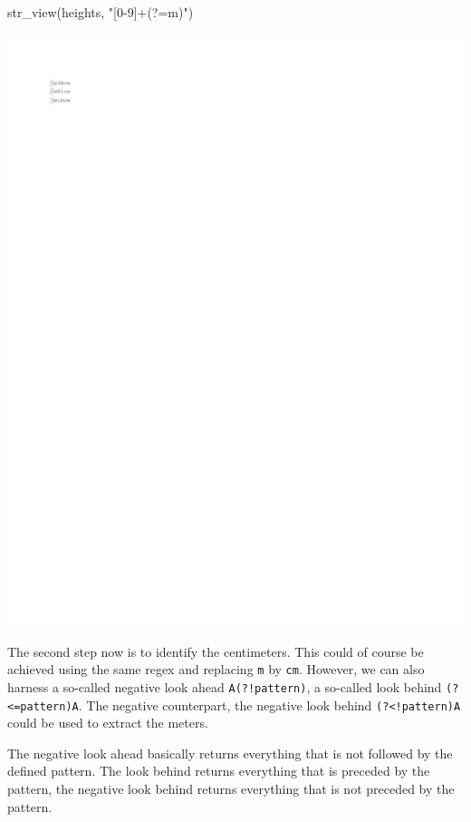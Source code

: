\documentclass[
]{book}
\newenvironment{Shaded}{\begin{snugshade}}{\end{snugshade}}
\newcommand{\FunctionTok}[1]{\textcolor[rgb]{0.00,0.00,0.00}{#1}}
\newcommand{\NormalTok}[1]{#1}
\newcommand{\StringTok}[1]{\textcolor[rgb]{0.31,0.60,0.02}{#1}}
\begin{document}
\begin{Shaded}
\begin{Highlighting}[]
\FunctionTok{str\_view}\NormalTok{(heights, }\StringTok{"[0{-}9]+(?=m)"}\NormalTok{)}
\end{Highlighting}
\end{Shaded}

\includegraphics{_main_files/figure-latex/unnamed-chunk-40-1.pdf}

The second step now is to identify the centimeters. This could of course be achieved using the same regex and replacing \texttt{m} by \texttt{cm}. However, we can also harness a so-called negative look ahead \texttt{A(?!pattern)}, a so-called look behind \texttt{(?\textless{}=pattern)A}. The negative counterpart, the negative look behind \texttt{(?\textless{}!pattern)A} could be used to extract the meters.

The negative look ahead basically returns everything that is not followed by the defined pattern. The look behind returns everything that is preceded by the pattern, the negative look behind returns everything that is not preceded by the pattern.
\end{document}
